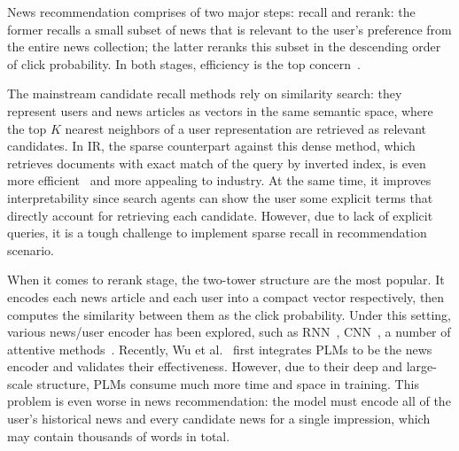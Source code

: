 \documentclass[sigconf,anonymous]{acmart}
\begin{document}
News recommendation comprises of two major steps: recall and rerank: the former recalls a small subset of news that is relevant to the user's preference from the entire news collection; the latter reranks this subset in the descending order of click probability. In both stages, efficiency is the top concern~\cite{liu_Hifi-ark,LightRec,Octopus}.

The mainstream candidate recall methods rely on similarity search: they represent users and news articles as vectors in the same semantic space, where the top $K$ nearest neighbors of a user representation are retrieved as relevant candidates. In IR, the sparse counterpart against this dense method, which retrieves documents with exact match of the query by inverted index, is even more efficient~\cite{sparse_and_dense_recall} and more appealing to industry. At the same time, it improves interpretability since search agents can show the user some explicit terms that directly account for retrieving each candidate. However, due to lack of explicit queries, it is a tough challenge to implement sparse recall in recommendation scenario.

When it comes to rerank stage, the two-tower structure are the most popular. It encodes each news article and each user into a compact vector respectively, then computes the similarity between them as the click probability. Under this setting, various news/user encoder has been explored, such as RNN~\cite{lian_DFM}, CNN~\cite{wu_NAML}, a number of attentive methods~\cite{wu_NRMS, NPA, NAML}.
Recently, Wu et al.~\cite{wu_newsPLM} first integrates PLMs to be the news encoder and validates their effectiveness. However, due to their deep and large-scale structure, PLMs consume much more time and space in training. This problem is even worse in news recommendation: the model must encode all of the user's historical news and every candidate news for a single impression, which may contain thousands of words in total.







\end{document}
